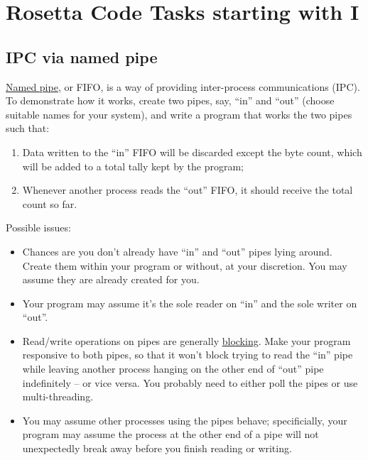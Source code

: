 %
%
%

\chapter{Rosetta Code Tasks starting with I}

\section*{IPC via named pipe}

\href{http://en.wikipedia.org/wiki/Named\_pipe}{Named pipe}, or FIFO, is
a way of providing inter-process communications (IPC). To demonstrate
how it works, create two pipes, say, ``in'' and ``out'' (choose suitable
names for your system), and write a program that works the two pipes
such that:

\begin{enumerate}
\item
  Data written to the ``in'' FIFO will be discarded except the byte
  count, which will be added to a total tally kept by the program;
\item
  Whenever another process reads the ``out'' FIFO, it should receive the
  total count so far.
\end{enumerate}

Possible issues:

\begin{itemize}
\item
  Chances are you don't already have ``in'' and ``out'' pipes lying
  around. Create them within your program or without, at your
  discretion. You may assume they are already created for you.
\item
  Your program may assume it's the sole reader on ``in'' and the sole
  writer on ``out''.
\item
  Read/write operations on pipes are generally
  \href{http://en.wikipedia.org/wiki/Blocking\_(computing)}{blocking}.
  Make your program responsive to both pipes, so that it won't block
  trying to read the ``in'' pipe while leaving another process hanging
  on the other end of ``out'' pipe indefinitely -- or vice versa. You
  probably need to either poll the pipes or use multi-threading.
\item
  You may assume other processes using the pipes behave; specificially,
  your program may assume the process at the other end of a pipe will
  not unexpectedly break away before you finish reading or writing.
\end{itemize}




